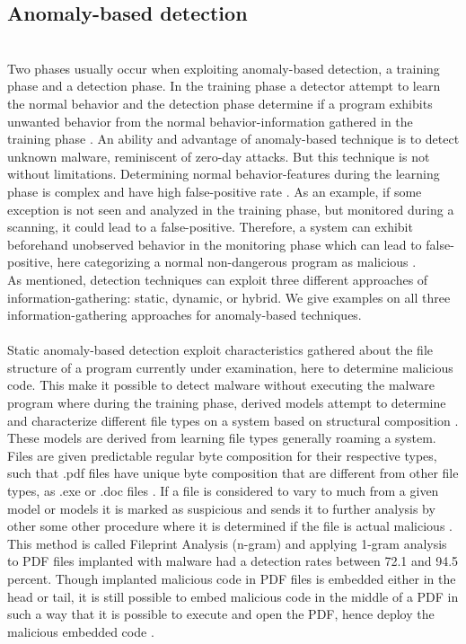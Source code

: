 \documentclass[12pt]{article} %
\begin{document}
\subsection{Anomaly-based detection}
\\
Two phases usually occur when exploiting anomaly-based detection, a training phase and a detection phase. In the training phase a detector attempt to learn the normal behavior and the detection phase determine if a program exhibits unwanted behavior from the normal behavior-information gathered in the training phase \cite{idika2007survey}. An ability and advantage of anomaly-based technique is to detect unknown malware, reminiscent of zero-day attacks. But this technique is not without limitations. Determining normal behavior-features during the learning phase is complex and have high false-positive rate \cite{idika2007survey}. As an example, if some exception is not seen and analyzed in the training phase, but monitored during a scanning, it could lead to a false-positive. Therefore, a system can exhibit beforehand unobserved behavior in the monitoring phase which can lead to false-positive, here categorizing a normal non-dangerous program as malicious \cite{idika2007survey}. \\
As mentioned, detection techniques can exploit three different approaches of information-gathering: static, dynamic, or hybrid. We give examples on all three information-gathering approaches for anomaly-based techniques. \\ \\
Static anomaly-based detection exploit characteristics gathered about the file structure of a program currently under examination, here to determine malicious code. This make it possible to detect malware without executing the malware program where during the training phase, derived models attempt to determine and characterize different file types on a system  based on structural composition \cite{idika2007survey}. These models are derived from learning file types generally roaming a system. Files are given predictable regular byte composition for their respective types, such that .pdf files have unique byte composition that are different from other file types, as .exe or .doc files \cite{idika2007survey}. If a file is considered to vary to much from a given model or models it is marked as suspicious and sends it to further analysis by other some other procedure where it is determined if the file is actual malicious \cite{idika2007survey}. This method is called Fileprint Analysis (n-gram) and applying 1-gram analysis to PDF files implanted with malware had a detection rates between 72.1 and 94.5 percent. Though implanted malicious code in PDF files is embedded either in the head or tail, it is still possible to embed malicious code in the middle of a PDF in such a way that it is possible to execute and open the PDF, hence deploy the malicious embedded code \cite{idika2007survey}. \\
\end{document}
